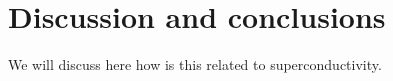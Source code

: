 \chapter{Discussion and conclusions}
\label{chap:conclusions}

We will discuss here how is this related to superconductivity.